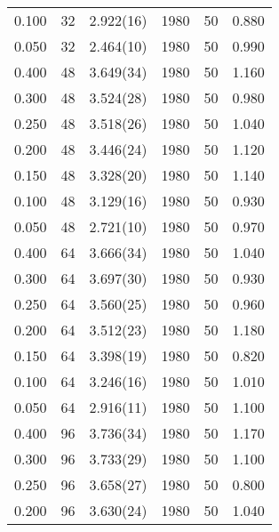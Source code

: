 \begin{tabular}{rrlrrr}
 0.100 &      32 & 2.922(16)  &                 1980 &                   50 &    0.880 \\
 0.050 &      32 & 2.464(10)  &                 1980 &                   50 &    0.990 \\
 0.400 &      48 & 3.649(34)  &                 1980 &                   50 &    1.160 \\
 0.300 &      48 & 3.524(28)  &                 1980 &                   50 &    0.980 \\
 0.250 &      48 & 3.518(26)  &                 1980 &                   50 &    1.040 \\
 0.200 &      48 & 3.446(24)  &                 1980 &                   50 &    1.120 \\
 0.150 &      48 & 3.328(20)  &                 1980 &                   50 &    1.140 \\
 0.100 &      48 & 3.129(16)  &                 1980 &                   50 &    0.930 \\
 0.050 &      48 & 2.721(10)  &                 1980 &                   50 &    0.970 \\
 0.400 &      64 & 3.666(34)  &                 1980 &                   50 &    1.040 \\
 0.300 &      64 & 3.697(30)  &                 1980 &                   50 &    0.930 \\
 0.250 &      64 & 3.560(25)  &                 1980 &                   50 &    0.960 \\
 0.200 &      64 & 3.512(23)  &                 1980 &                   50 &    1.180 \\
 0.150 &      64 & 3.398(19)  &                 1980 &                   50 &    0.820 \\
 0.100 &      64 & 3.246(16)  &                 1980 &                   50 &    1.010 \\
 0.050 &      64 & 2.916(11)  &                 1980 &                   50 &    1.100 \\
 0.400 &      96 & 3.736(34)  &                 1980 &                   50 &    1.170 \\
 0.300 &      96 & 3.733(29)  &                 1980 &                   50 &    1.100 \\
 0.250 &      96 & 3.658(27)  &                 1980 &                   50 &    0.800 \\
 0.200 &      96 & 3.630(24)  &                 1980 &                   50 &    1.040 \\

\end{tabular}
